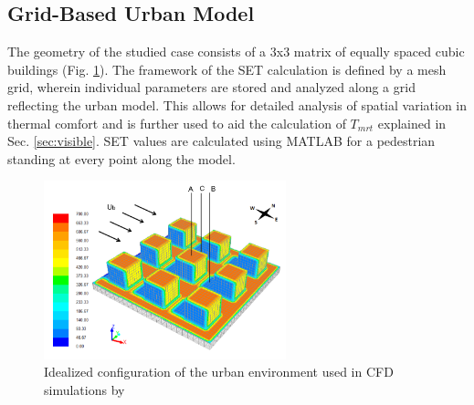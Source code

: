 \documentclass[smallextended]{svjour3}
\begin{document}
\subsection{Grid-Based Urban Model}
\label{sec:gridModel}
The geometry of the studied case consists of a 3x3 matrix of equally spaced cubic buildings (Fig. \ref{Fig.IdealUrban}). The framework of the SET calculation is defined by a mesh grid, wherein individual parameters are stored and analyzed along a grid reflecting the urban model. This allows for detailed analysis of spatial variation in thermal comfort and is further used to aid the calculation of $T_{mrt}$  explained in Sec. \ref{sec:visible}. SET values are calculated using MATLAB for a pedestrian standing at every point along the model.  

\begin {figure}[!h]
\graphicspath{ {image/} }
\includegraphics[width=7cm]{ThermalEnvironmentModel.PNG}
\centering
\caption{Idealized configuration of the urban environment used in CFD simulations by \citet{nazarian2014effects}}
\label{Fig.IdealUrban}
\end {figure}

\end{document}

